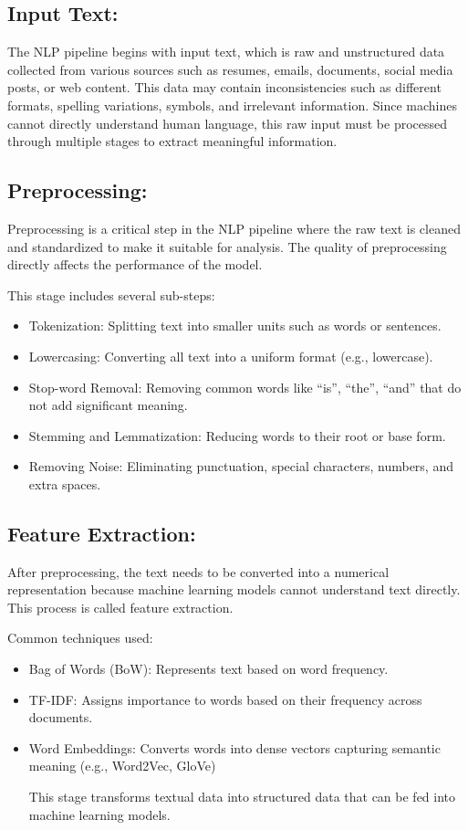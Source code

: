 \subsection{Input Text:}
{%
The NLP pipeline begins with input text, which is raw and unstructured data collected from various sources such as resumes, emails, documents, social media posts, or web content. This data may contain inconsistencies such as different formats, spelling variations, symbols, and irrelevant information. Since machines cannot directly understand human language, this raw input must be processed through multiple stages to extract meaningful information.}

\subsection{Preprocessing:}

Preprocessing is a critical step in the NLP pipeline where the raw text is cleaned and standardized to make it suitable for analysis. The quality of preprocessing directly affects the performance of the model.

\noindent This stage includes several sub-steps:
\begin{itemize}
\item Tokenization: Splitting text into smaller units such as words or sentences.
\item  Lowercasing: Converting all text into a uniform format (e.g., lowercase).
\item Stop-word Removal: Removing common words like “is”, “the”, “and” that do not add significant meaning.
\item Stemming and Lemmatization: Reducing words to their root or base form.
\item Removing Noise: Eliminating punctuation, special characters, numbers, and extra spaces.
\end{itemize} 
\subsection{Feature Extraction:}

After preprocessing, the text needs to be converted into a numerical representation because machine learning models cannot understand text directly. This process is called feature extraction.

\noindent Common techniques used:
\begin{itemize}
    \item Bag of Words (BoW): Represents text based on word frequency.
    \item TF-IDF: Assigns importance to words based on their frequency across documents.
    \item Word Embeddings: Converts words into dense vectors capturing semantic meaning (e.g., Word2Vec, GloVe)

This stage transforms textual data into structured data that can be fed into machine learning models.
\end{itemize}
